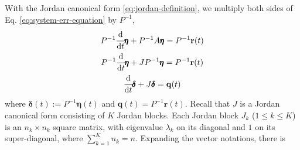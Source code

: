 \documentclass[]{uai2023}
\newcommand{\vect}[1]{\mathbf{#1}}
\newcommand{\dt}[1]{\cfrac{\mathrm{d} #1}{\mathrm{d} t}}
\newcommand{\Err}{\eta}
\begin{document}
    With the Jordan canonical form \ref{eq:jordan-definition}, we multiply both sides of Eq. \ref{eq:system-err-equation} by $P^{-1}$,
    \begin{gather}
        P^{-1}\dt{}\pmb{\Err} + P^{-1}A \pmb{\Err} = P^{-1}\vect{r}(t) \\
        P^{-1}\dt{}\pmb{\Err} + JP^{-1} \pmb{\Err} = P^{-1}\vect{r}(t) \\
        \dt{}\pmb{\delta} + J \pmb{\delta}  = \vect{q}(t) 
    \end{gather}
    where $\pmb{\delta}(t) := P^{-1}\pmb{\Err}(t)$ and $\vect{q}(t) = P^{-1}\vect{r}(t)$. Recall that $J$ is a Jordan canonical form consisting of $K$ Jordan blocks. Each Jordan block $J_k$ ($1\leq k \leq K$) is an $n_k \times n_k$ square matrix, with eigenvalue $\lambda_k$ on its diagonal and $1$ on its super-diagonal, where $\sum_{k=1}^{K} n_k = n$. Expanding the vector notations, there is 
    \begingroup
        \newcommand{\?}[1]{\multicolumn{1}{c|}{#1}}
\end{document}
